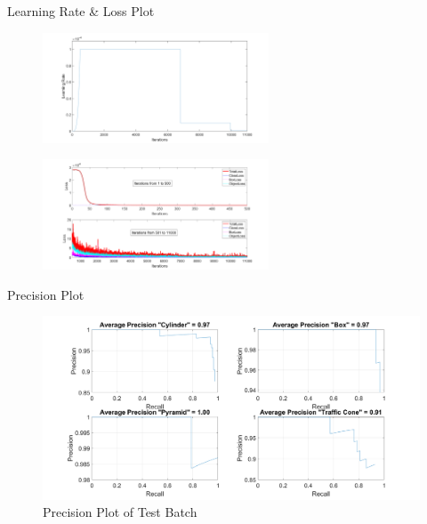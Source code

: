 \documentclass[10pt]{beamer}
\begin{document}
\begin{frame}{Learning Rate \& Loss Plot}

\begin{figure}
    \centering
    \includegraphics[width=0.6\textwidth]{Images/Learning Rate.png}
\end{figure}

\begin{figure}
    \centering
    \includegraphics[width=0.6\textwidth]{Images/lossplot.png}
\end{figure}
\end{frame}

\begin{frame}{Precision Plot}
\begin{figure}
    \centering
    \includegraphics[width=1\textwidth]{Images/Precision_plot.png}
    \caption{Precision Plot of Test Batch}
\end{figure}
\end{frame}
\end{document}
